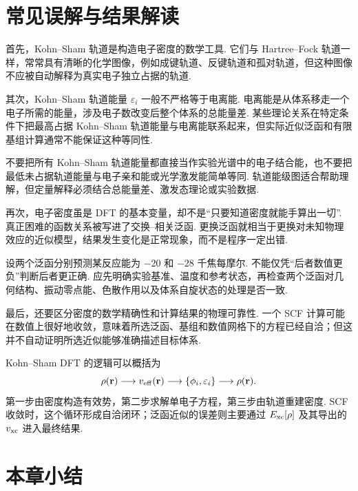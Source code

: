 \documentclass[UTF8,11pt,a4paper,openany]{ctexbook}
\begin{document}
\section{常见误解与结果解读}

首先，Kohn--Sham 轨道是构造电子密度的数学工具. 它们与 Hartree--Fock 轨道一样，常常具有清晰的化学图像，例如成键轨道、反键轨道和孤对轨道，但这种图像不应被自动解释为真实电子独立占据的轨道. 

其次，Kohn--Sham 轨道能量 $\varepsilon_i$ 一般不严格等于电离能. 电离能是从体系移走一个电子所需的能量，涉及电子数改变后整个体系的总能量差. 某些理论关系在特定条件下把最高占据 Kohn--Sham 轨道能量与电离能联系起来，但实际近似泛函和有限基组计算通常不能保证这种等同性. 

\begin{limitbox}
不要把所有 Kohn--Sham 轨道能量都直接当作实验光谱中的电子结合能，也不要把最低未占据轨道能量与电子亲和能或光学激发能简单等同. 轨道能级图适合帮助理解，但定量解释必须结合总能量差、激发态理论或实验数据. 
\end{limitbox}

再次，电子密度虽是 DFT 的基本变量，却不是“只要知道密度就能手算出一切”. 真正困难的函数关系被写进了交换--相关泛函. 更换泛函就相当于更换对未知物理效应的近似模型，结果发生变化是正常现象，而不是程序一定出错. 

\begin{examplebox}
设两个泛函分别预测某反应能为 $-20$ 和 $-28$ 千焦每摩尔. 不能仅凭“后者数值更负”判断后者更正确. 应先明确实验基准、温度和参考状态，再检查两个泛函对几何结构、振动零点能、色散作用以及体系自旋状态的处理是否一致. 
\end{examplebox}

最后，还要区分密度的数学精确性和计算结果的物理可靠性. 一个 SCF 计算可能在数值上很好地收敛，意味着所选泛函、基组和数值网格下的方程已经自洽；但这并不自动证明所选近似能够准确描述目标体系. 

\begin{derivationbox}
Kohn--Sham DFT 的逻辑可以概括为
\[
\rho(\mathbf r)
\longrightarrow
v_{\rm eff}(\mathbf r)
\longrightarrow
\{\phi_i,\varepsilon_i\}
\longrightarrow
\rho(\mathbf r).
\]
第一步由密度构造有效势，第二步求解单电子方程，第三步由轨道重建密度. SCF 收敛时，这个循环形成自洽闭环；泛函近似的误差则主要通过 $E_{\rm xc}[\rho]$ 及其导出的 $v_{\rm xc}$ 进入最终结果. 
\end{derivationbox}

\section{本章小结}
\end{document}
